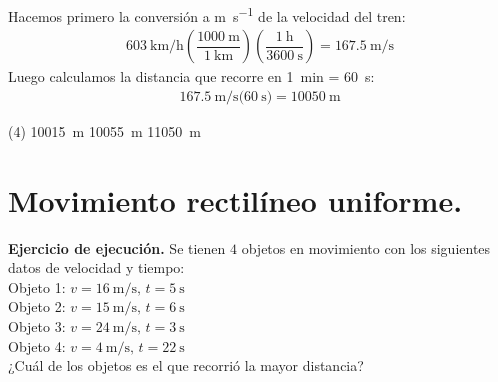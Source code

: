 \documentclass[12pt, letter]{exam}
\begin{document}
\begin{questions}
    \vspace*{0.5cm}
    Hacemos primero la conversión a \unit{\meter\per\second} de la velocidad del tren:
    \begin{align*}
        \SI[per-mode=fraction]{603}{\kilo\meter\per\hour} \left( \dfrac{\SI{1000}{\meter}}{\SI{1}{\kilo\meter}} \right) \left( \dfrac{\SI{1}{\hour}}{\SI{3600}{\second}} \right) = \SI[per-mode=fraction]{167.5}{\meter\per\second}
    \end{align*}
    Luego calculamos la distancia que recorre en \SI{1}{\minute} = \SI{60}{\second}:
    \begin{align*}
        \SI[per-mode=fraction]{167.5}{\meter\per\second} \bigg( \SI{60}{\second} \bigg) = \SI{10050}{\meter}
    \end{align*}
    \begin{tasks}(4)
        \task \SI{10015}{\meter}
        \task {}
        \task \SI{10055}{\meter}
        \task \SI{11050}{\meter}
    \end{tasks}

    \section{Movimiento rectilíneo uniforme.}

    \setcounter{question}{5} \question  \label{Ejercicio_02} \textbf{Ejercicio de ejecución. } Se tienen $4$ objetos en movimiento con los siguientes datos de velocidad y tiempo: \\[0.3em]
    Objeto 1: $v = \SI{16}{\meter\per\second}, \, t = \SI{5}{\second}$ \\[0.3em]
    Objeto 2: $v = \SI{15}{\meter\per\second}, \, t = \SI{6}{\second}$ \\[0.3em]
    Objeto 3: $v = \SI{24}{\meter\per\second}, \, t = \SI{3}{\second}$ \\[0.3em]
    Objeto 4: $v = \SI{4}{\meter\per\second}, \, t = \SI{22}{\second}$ \\[0.3em]
    ¿Cuál de los objetos es el que recorrió la mayor distancia? 
    

\end{questions}
\end{document}
